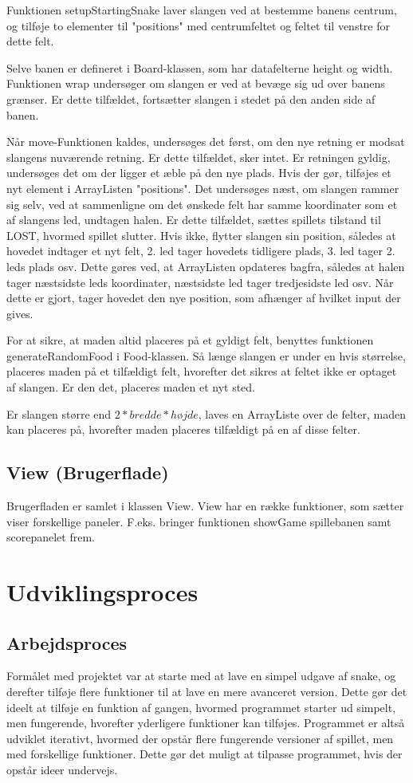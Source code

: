 \documentclass{report}
\begin{document}
Funktionen setupStartingSnake laver slangen ved at bestemme banens centrum, og tilføje to elementer til "positions" med centrumfeltet og feltet til venstre for dette felt.

Selve banen er defineret i Board-klassen, som har datafelterne height og width. Funktionen wrap undersøger om slangen er ved at bevæge sig ud over banens grænser. Er dette tilfældet, fortsætter slangen i stedet på den anden side af banen.

Når move-Funktionen kaldes, undersøges det først, om den nye retning er modsat slangens nuværende retning. Er dette tilfældet, sker intet. Er retningen gyldig, undersøges det om der ligger et æble på den nye plads. Hvis der gør, tilføjes et nyt element i ArrayListen "positions". 
Det undersøges næst, om slangen rammer sig selv, ved at sammenligne om det ønskede felt har samme koordinater som et af slangens led, undtagen halen. Er dette tilfældet, sættes spillets tilstand til LOST, hvormed spillet slutter. Hvis ikke, flytter slangen sin position, således at hovedet indtager et nyt felt, 2. led tager hovedets tidligere plads, 3. led tager 2. leds plads osv. Dette gøres ved, at ArrayListen opdateres bagfra, således at halen tager næstsidste leds koordinater, næstsidste led tager tredjesidste led osv. Når dette er gjort, tager hovedet den nye position, som afhænger af hvilket input der gives.

For at sikre, at maden altid placeres på et gyldigt felt, benyttes funktionen generateRandomFood i Food-klassen. Så længe slangen er under en hvis størrelse, placeres maden på et tilfældigt felt, hvorefter det sikres at feltet ikke er optaget af slangen. Er den det, placeres maden et nyt sted.

Er slangen større end $2*bredde*højde$, laves en ArrayListe over de felter, maden kan placeres på, hvorefter maden placeres tilfældigt på en af disse felter.

\subsection{View (Brugerflade)}
Brugerfladen er samlet i klassen View. View har en række funktioner, som sætter viser forskellige paneler. F.eks. bringer funktionen showGame spillebanen samt scorepanelet frem. 

\section{Udviklingsproces}
\subsection{Arbejdsproces}
Formålet med projektet var at starte med at lave en simpel udgave af snake, og derefter tilføje flere funktioner til at lave en mere avanceret version. Dette gør det ideelt at tilføje en funktion af gangen, hvormed programmet starter ud simpelt, men fungerende, hvorefter yderligere funktioner kan tilføjes. Programmet er altså udviklet iterativt, hvormed der opstår flere fungerende versioner af spillet, men med forskellige funktioner. Dette gør det muligt at tilpasse programmet, hvis der opstår ideer undervejs. 
\end{document}
